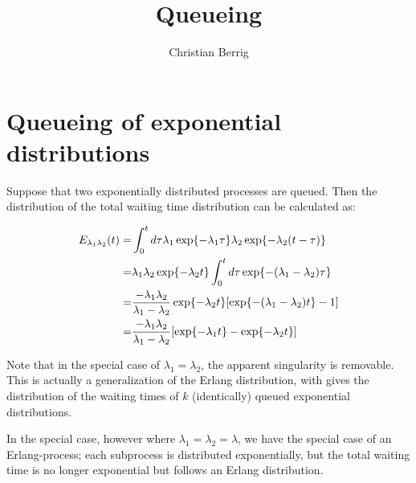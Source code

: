 \documentclass{article}
\author{Christian Berrig}
\title{Queueing}
\begin{document}

\maketitle



\section{Queueing of exponential distributions} 

Suppose that two exponentially distributed processes are queued. 
Then the distribution of the total waiting time distribution can be calculated as:

\begin{align*}
	E_{\lambda_{1} \lambda_{2}}(t) 
	=& \int_{0}^{t} \dd \tau \lambda_{1} \exp{ - \lambda_{1}\tau} \lambda_{2} \exp{- \lambda_{2}(t-\tau)} \\
	=& \lambda_{1} \lambda_{2} \exp{- \lambda_{2} t} \int_{0}^{t} \dd \tau \exp{- (\lambda_{1} - \lambda_{2})\tau} \\
	=& \frac{- \lambda_{1} \lambda_{2}}{\lambda_{1} - \lambda_{2}} \exp{-\lambda_{2} t} \qty[ \exp{-(\lambda_{1} - \lambda_{2}) t } - 1] \\
	=& \frac{- \lambda_{1} \lambda_{2}}{\lambda_{1} - \lambda_{2}} \qty[ \exp{- \lambda_{1} t} - \exp{- \lambda_{2} t}] \\
\end{align*}

Note that in the special case of $\lambda_{1} = \lambda_{2}$, the apparent singularity is removable.
This is actually a generalization of the Erlang distribution, with gives the distribution of the waiting times of $k$ (identically) queued exponential distributions.

In the special case, however where $\lambda_{1} = \lambda_{2} = \lambda$, we have the special case of an Erlang-process; each subprocess is distributed exponentially, but the total waiting time is no longer exponential but follows an Erlang distribution.
\end{document}
